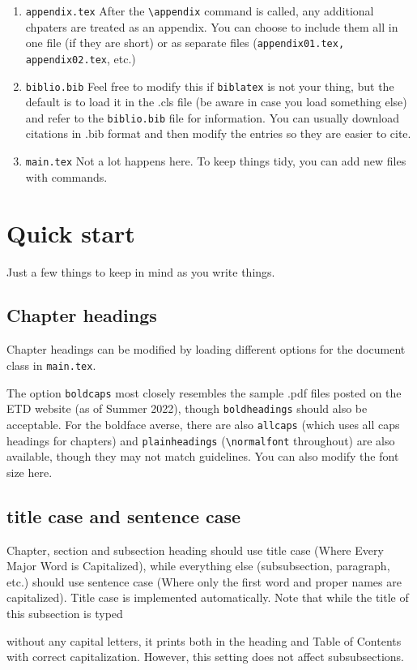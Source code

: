 \begin{enumerate}
\item \texttt{appendix.tex} After the \verb|\appendix| command is called, any additional chpaters are treated as an appendix. You can choose to include them all in one file (if they are short) or as separate files (\texttt{appendix01.tex, appendix02.tex}, etc.)
\item \texttt{biblio.bib} Feel free to modify this if \texttt{biblatex} is not your thing, but the default is to load it in the .cls file (be aware in case you load something else) and refer to the \texttt{biblio.bib} file for information. You can usually download citations in .bib format and then modify the entries so they are easier to cite. 
\item \texttt{main.tex} Not a lot happens here. To keep things tidy, you can add new files with \verb|| commands.
\end{enumerate}

\section{Quick start}
Just a few things to keep in mind as you write things. 
\subsection{Chapter headings}
Chapter headings can be modified by loading different options for the document class in \texttt{main.tex}.



The option \texttt{boldcaps} most closely resembles the sample .pdf files posted on the ETD website (as of Summer 2022), though \texttt{boldheadings} should also be acceptable. For the boldface averse, there are also \texttt{allcaps} (which uses all caps headings for chapters) and \texttt{plainheadings} (\verb|\normalfont| throughout) are also available, though they may not match guidelines. You can also modify the font size here. 

\subsection{title case and sentence case}
Chapter, section and subsection heading should use title case (Where Every Major Word is Capitalized), while everything else (subsubsection, paragraph, etc.) should use sentence case (Where only the first word and proper names are capitalized). Title case is implemented automatically. Note that while the title of this subsection is typed

without any capital letters, it prints both in the heading and Table of Contents with correct capitalization. However, this setting does not affect subsubsections.

